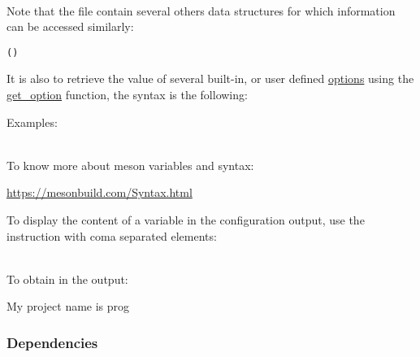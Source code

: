 \\[-0.25cm]
\noindent Note that the file  contain several others data structures for which information can be accessed similarly: 
\begin{center}\texttt{()}\end{center}
It is also to retrieve the value of several built-in, or user defined \href{https://mesonbuild.com/Build-options.html}{options} using the \href{https://mesonbuild.com/Reference-manual\_functions.html#get\_option}{get\_option} function, the syntax is the following: 
\begin{center}\end{center}
\noindent Examples:
\vspace{-0.25cm}
{\footnotesize{
\begin{script}

\end{script} 
}}
\\[-0.5cm]
\noindent To know more about meson variables and syntax:
\begin{center}\href{https://mesonbuild.com/Syntax.html}{https://mesonbuild.com/Syntax.html}\end{center}
\noindent To display the content of a variable in the configuration output, use the  instruction with coma separated elements:
\\[-0.75cm]
\begin{script}
\end{script}
\\[-0.75cm]
\noindent To obtain in the output:\\[-0.75cm]
\begin{script}
 My project name is prog
\end{script}
\newpage
\subsubsection*{Dependencies}
\label{meson_deps}

